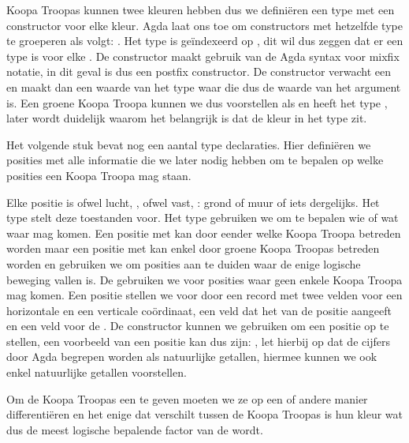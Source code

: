 Koopa Troopas kunnen twee kleuren hebben dus we definiëren een type
 met een constructor voor elke kleur. Agda laat ons toe om
constructors met hetzelfde type te groeperen als volgt: . Het type  is geïndexeerd op , dit wil
dus zeggen dat er een type is voor elke . De constructor maakt
gebruik van de Agda syntax voor mixfix notatie, in dit geval is  dus
een postfix constructor. De  constructor verwacht een 
en maakt dan een waarde van het type  waar die 
dus de waarde van het argument is. Een groene Koopa Troopa kunnen we dus
voorstellen als  en heeft het type ,
later wordt duidelijk waarom het belangrijk is dat de kleur in het type zit.

Het volgende stuk bevat nog een aantal type declaraties. Hier definiëren we
posities met alle informatie die we later nodig hebben om te bepalen op welke
posities een Koopa Troopa mag staan.


Elke positie is ofwel lucht, , ofwel vast, : grond of
muur of iets dergelijks. Het type  stelt deze toestanden voor.
Het type  gebruiken we om te bepalen wie of wat waar mag
komen. Een positie met   kan door eender welke
Koopa Troopa betreden worden maar een positie met 
 kan enkel door groene Koopa Troopas betreden worden en gebruiken
we om posities aan te duiden waar de enige logische beweging vallen is. De
  gebruiken we voor posities waar geen enkele
Koopa Troopa mag komen. Een positie stellen we voor door een record met twee
velden voor een horizontale en een verticale coördinaat, een veld dat het
 van de positie aangeeft en een veld voor de .
De constructor  kunnen we gebruiken om een positie op te stellen,
een voorbeeld van een positie kan dus zijn: , let
hierbij op dat de cijfers door Agda begrepen worden als natuurlijke getallen,
hiermee kunnen we ook enkel natuurlijke getallen voorstellen.

Om de Koopa Troopas een  te geven moeten we ze op een of
andere manier differentiëren en het enige dat verschilt tussen de Koopa Troopas
is hun kleur wat dus de meest logische bepalende factor van de
 wordt.

